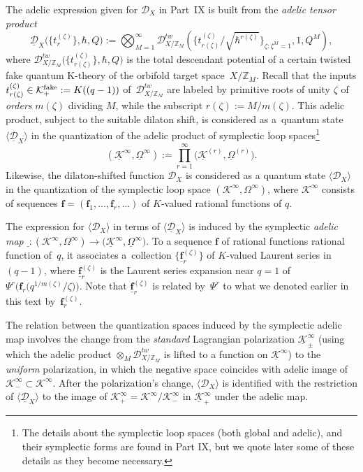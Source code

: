 \documentclass[pdftex]{sigma}
\def\D{\mathcal D}
\def\K{\mathcal K}
\def\ZZ{\mathbb Z}
\def\f{{\mathbf f}}
\def\h{\hbar}
\def\lan{\langle}
\def\ran{\rangle}
\def\und{\underline}
\begin{document}
The adelic expression given for $\D_X$ in Part~IX is built from the {\em adelic tensor product}
\[ \und{\D}_X \big(\big\{ t_r^{(\zeta)} \big\}, \h, Q\big):= \bigotimes_{M=1}^{\infty} \D_{X/\ZZ_M}^{tw} \left( \Big\{ t_{r(\zeta)}^{(\zeta)}/\sqrt{\h^{r(\zeta)}} \Big\}_{\zeta\colon \zeta^M=1} , 1, Q^M\right),\]
where $\D_{X/\ZZ_M}^{tw}\big(\big\{ t^{(\zeta)}_{r(\zeta)} \big\}, \h, Q\big)$ is the total descendant potential of a certain twisted fake quantum K-theory of the orbifold target space~$X/\ZZ_M$. Recall that the inputs $t_{r(\zeta)}^{(\zeta)} \in \K^{\rm fake}_{+}:=K((q-1))$ of~$\D_{X/\ZZ_M}^{tw}$ are labeled by primitive roots of unity $\zeta$ of {\em orders} $m(\zeta)$ dividing $M$, while the subscript $r(\zeta):=M/m(\zeta)$. This adelic product, subject to the suitable dilaton shift, is considered as a~quantum state $\lan \und{\D}_X\ran$ in the quantization of the adelic product of symplectic loop spaces\footnote{The details about the symplectic loop spaces (both global and adelic), and their symplectic forms are found in Part IX, but we quote later some of these details as they become necessary.}
\[ (\und{\K}^{\infty},\und{\Omega}^{\infty}):=\prod_{r=1}^{\infty}\big(\und{\K}^{(r)},
\und{\Omega}^{(r)}\big).\]
Likewise, the dilaton-shifted function $\D_X$ is considered as a quantum state $\lan \D_X\ran$ in the quantization of the symplectic loop space $(\K^{\infty},\Omega^{\infty})$, where $\K^{\infty}$ consists of sequences $\f=(\f_1,\dots,\f_r,\dots)$ of $K$-valued rational
functions of $q$.

The expression for $\lan \D_X \ran$ in terms of
$\lan \und{\D}_X\ran$ is induced by the symplectic {\em adelic map} $\und{\ }\colon (\K^{\infty},\Omega^{\infty})\! \allowbreak \to \big(\und{\K}^{\infty},\und{\Omega}^{\infty}\big)$. To a sequence $\f$ of rational functions rational function of~$q$, it associates a~collection $\big\{ \und{\f}_r^{(\zeta)} \big\}$ of $K$-valued Laurent series in~$(q-1)$, where $\und{\f}_r^{(\zeta)}$ is the Laurent series expansion near $q=1$ of~$\Psi^r\big(\f_r\big(q^{1/m(\zeta)}/\zeta\big)\big)$. Note that $\und{\f}_r^{(\zeta)}$ is related by~$\Psi^r$ to what we denoted earlier in this text by~$\f_r^{(\zeta)}$.

 The relation between the quantization spaces
induced by the symplectic adelic map involves the change from the {\em standard} Lagrangian polarization $\und{\K}^{\infty}_{\pm}$ (using which the adelic product $\otimes_M \D_{X/\ZZ_M}^{tw}$ is lifted to a function on $\und{\K}^{\infty}$) to the {\em uniform} polarization, in which the negative space coincides with adelic image of $\K^{\infty}_{-} \subset \K^{\infty}$. After the polarization's change, $\lan \D_X\ran$ is identified with the restriction
of $\lan \und{\D}_X\ran$ to the image of $\K^{\infty}_{+}=\K^{\infty}/\K^{\infty}_{-}$ in $\und{\K}^{\infty}_{+}$ under the adelic map.
\end{document}

